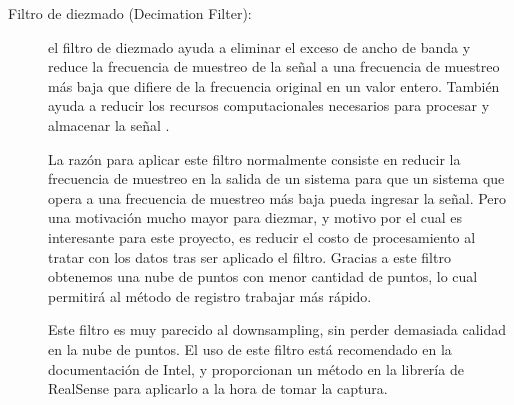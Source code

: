 \begin{description}

    \item[Filtro de diezmado (Decimation Filter):]
    
    el filtro de diezmado ayuda a eliminar el exceso de ancho de banda y reduce la frecuencia de muestreo de la señal a una frecuencia de muestreo más baja que difiere de la frecuencia original en un valor entero.
    También ayuda a reducir los recursos computacionales necesarios para procesar y almacenar la señal \citep{engineerAmbitiosly}.

    La razón para aplicar este filtro normalmente consiste en reducir la frecuencia de muestreo en la salida de un sistema para que un sistema que opera a una frecuencia de muestreo más baja pueda ingresar la señal.
    Pero una motivación mucho mayor para diezmar, y motivo por el cual es interesante para este proyecto, es reducir el costo de procesamiento al tratar con los datos tras ser aplicado el filtro. Gracias a este filtro obtenemos una nube de puntos con menor cantidad de puntos, lo cual permitirá al método de registro trabajar más rápido.

    Este filtro es muy parecido al downsampling, sin perder demasiada calidad en la nube de puntos. El uso de este filtro está recomendado en la documentación de Intel, y proporcionan un método en la librería de RealSense para aplicarlo a la hora de tomar la captura.
    
    




\end{description}
